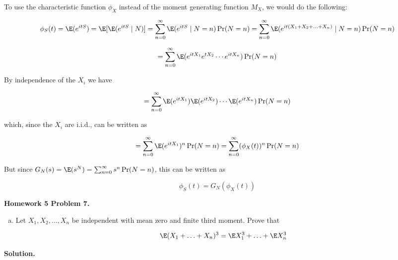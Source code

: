 To use the characteristic function \(\phi_X\) instead of the moment generating function \(M_X\), we would do the following:

\[
\phi_S(t) = \E(e^{itS}) = \E[ \E(e^{itS} \mid N)] =\sum_{n=0}^\infty \E(e^{itS} \mid N = n) \Pr(N = n) =\sum_{n=0}^\infty \E(e^{it(X_1 + X_2 + \ldots + X_n)} \mid N = n) \Pr(N = n)
\]

\[
=\sum_{n=0}^\infty \E(e^{itX_1} e^{tX_2}\cdots e^{it X_n} ) \Pr(N = n)
\]

By independence of the \(X_i\) we have

\[
=\sum_{n=0}^\infty \E(e^{itX_1}) \E( e^{itX_2})\cdots \E( e^{it X_n}) \Pr(N = n)
\]

which, since the \(X_i\) are i.i.d., can be written as

\[
=\sum_{n=0}^\infty \E(e^{itX_1})^n \Pr(N = n) =\sum_{n=0}^\infty (\phi_X(t))^n \Pr(N = n)
\]

But since \(G_N(s) = \E(s^N) = \sum_{n=0}^\infty s^n \Pr(N = n)\), this can be written as

\[
\phi_S(t) = G_N(\phi_X(t))
\]


\textbf{Homework 5 Problem 7.}

\begin{enumerate}[(a)]

\item Let \(X_1, X_2, \ldots, X_n\) be independent with mean zero and finite third moment. Prove that 

\[
\E(X_1 + \ldots + X_n)^3 = \E X_1^3 + \ldots + \E X_n^3
\]


\end{enumerate}

\textbf{Solution.}

